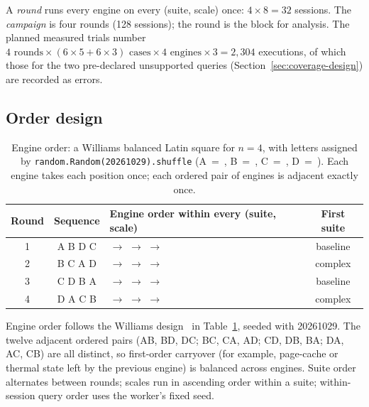 \documentclass[11pt]{article}
\begin{document}
A \emph{round} runs every engine on every (suite, scale) once: $4 \times 8 = 32$
sessions. The \emph{campaign} is four rounds (128 sessions); the round is the
block for analysis. The planned measured trials number
$4 \text{ rounds} \times (6 \times 5 + 6 \times 3) \text{ cases} \times 4
\text{ engines} \times 3 = 2{,}304$ executions, of which those for the two
pre-declared unsupported \polarsgpu{} queries (Section~\ref{sec:coverage-design})
are recorded as errors.

\subsection{Order design}
\label{sec:latin}

\begin{table}[t]
\centering
\caption{Engine order: a Williams balanced Latin square for $n=4$, with
letters assigned by \texttt{random.Random(20261029).shuffle} (A~=~\idsparkcpu,
B~=~\idpolarsgpu, C~=~\idpolarscpu, D~=~\idsparkgpu). Each engine takes each position
once; each ordered pair of engines is adjacent exactly once.}
\label{tab:latin}
\small
\begin{tabular}{@{}cclc@{}}
\toprule
Round & Sequence & Engine order within every (suite, scale) & First suite \\
\midrule
1 & A B D C & \sparkcpu{} $\to$ \polarsgpu{} $\to$ \sparkgpu{} $\to$ \polarscpu{} & baseline \\
2 & B C A D & \polarsgpu{} $\to$ \polarscpu{} $\to$ \sparkcpu{} $\to$ \sparkgpu{} & complex \\
3 & C D B A & \polarscpu{} $\to$ \sparkgpu{} $\to$ \polarsgpu{} $\to$ \sparkcpu{} & baseline \\
4 & D A C B & \sparkgpu{} $\to$ \sparkcpu{} $\to$ \polarscpu{} $\to$ \polarsgpu{} & complex \\
\bottomrule
\end{tabular}
\end{table}

Engine order follows the Williams design~\citep{williams1949latin} in
Table~\ref{tab:latin}, seeded with 20261029. The twelve adjacent ordered pairs
(AB, BD, DC; BC, CA, AD; CD, DB, BA; DA, AC, CB) are all distinct, so
first-order carryover (for example, page-cache or thermal state left by the
previous engine) is balanced across engines. Suite order alternates between
rounds; scales run in ascending order within a suite; within-session query
order uses the worker's fixed seed.
\end{document}
